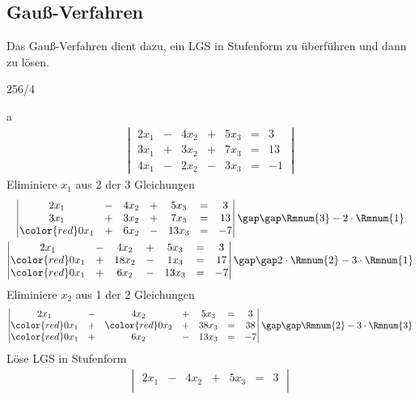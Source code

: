 \subsection{Gauß-Verfahren}
Das Gauß-Verfahren dient dazu, ein LGS in Stufenform zu überführen und dann zu lösen.
\begin{exercise}{256/4}
  \item [a]
  \begin{gather*}
    \begin{vmatrix}
      2x_1 & - & 4x_2 & + & 5x_3 & = & 3 \\
      3x_1 & + & 3x_2 & + & 7x_3 & = & 13 \\
      4x_1 & - & 2x_2 & - & 3x_3 & = & -1
    \end{vmatrix}
  \end{gather*}
  Eliminiere $x_1$ aus 2 der 3 Gleichungen
  \begin{gather*}
    \begin{vmatrix}
      2x_1 & - & 4x_2 & + & 5x_3 & = & 3 \\
      3x_1 & + & 3x_2 & + & 7x_3 & = & 13 \\
      {\color{red}0}x_1 & + & 6x_2 & - & 13x_3 & = & -7
    \end{vmatrix}
    \gap\gap \Rmnum{3} - 2 \cdot \Rmnum{1} \\
    \begin{vmatrix}
      2x_1 & - & 4x_2 & + & 5x_3 & = & 3 \\
      {\color{red}0}x_1 & + & 18x_2 & - & 1x_3 & = & 17 \\
      {\color{red}0}x_1 & + & 6x_2 & - & 13x_3 & = & -7
    \end{vmatrix}
    \gap\gap 2 \cdot \Rmnum{2} - 3 \cdot \Rmnum{1}
  \end{gather*}
  Eliminiere $x_2$ aus 1 der 2 Gleichungen
  \begin{gather*}
    \begin{vmatrix}
      2x_1 & - & 4x_2 & + & 5x_3 & = & 3 \\
      {\color{red}0}x_1 & + & {\color{red}0}x_2 & + & 38x_3 & = & 38 \\
      {\color{red}0}x_1 & + & 6x_2 & - & 13x_3 & = & -7
    \end{vmatrix}
    \gap\gap \Rmnum{2} - 3 \cdot \Rmnum{3}
  \end{gather*}
  Löse LGS in Stufenform
  \begin{gather*}
    \begin{vmatrix}
      2x_1 & - & 4x_2 & + & 5x_3 & = & 3 \\

\end{vmatrix}
\end{gather*}
\end{exercise}

